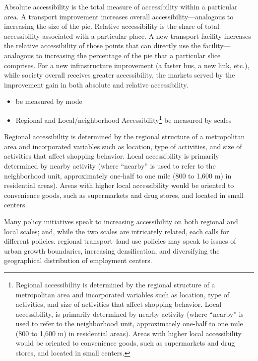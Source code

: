\documentclass[12pt,]{article}
\let\rmarkdownfootnote\footnote%
\def\footnote{\protect\rmarkdownfootnote}
\begin{document}
Absolute accessibility is the total measure of accessibility within a
particular area. A transport improvement increases overall
accessibility---analogous to increasing the size of the pie. Relative
accessibility is the share of total accessibility associated with a
particular place. A new transport facility increases the relative
accessibility of those points that can directly use the
facility---analogous to increasing the percentage of the pie that a
particular slice comprises. For a new infrastructure improvement (a
faster bus, a new link, etc.), while society overall receives greater
accessibility, the markets served by the improvement gain in both
absolute and relative accessibility.

\begin{itemize}
\item
  be measured by mode
\item
  Regional and Local/neighborhood Accessibility\footnote{Regional
    accessibility is determined by the regional structure of a
    metropolitan area and incorporated variables such as location, type
    of activities, and size of activities that affect shopping behavior.
    Local accessibility, is primarily determined by nearby activity
    (where ``nearby'' is used to refer to the neighborhood unit,
    approximately one-half to one mile (800 to 1,600 m) in residential
    areas). Areas with higher local accessibility would be oriented to
    convenience goods, such as supermarkets and drug stores, and located
    in small centers.} be measured by scales
\end{itemize}

Regional accessibility is determined by the regional structure of a
metropolitan area and incorporated variables such as location, type of
activities, and size of activities that affect shopping behavior. Local
accessibility is primarily determined by nearby activity (where
``nearby'' is used to refer to the neighborhood unit, approximately
one-half to one mile (800 to 1,600 m) in residential areas). Areas with
higher local accessibility would be oriented to convenience goods, such
as supermarkets and drug stores, and located in small centers.

Many policy initiatives speak to increasing accessibility on both
regional and local scales; and, while the two scales are intricately
related, each calls for different policies. regional transport--land use
policies may speak to issues of urban growth boundaries, increasing
densification, and diversifying the geographical distribution of
employment centers.
\end{document}
